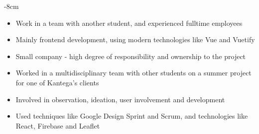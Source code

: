 \documentclass[9pt,a4paper]{altacv}
\begin{document}



\begin{adjustwidth}{}{-8cm}
\makecvheader
\end{adjustwidth}


\begin{itemize}
\item Work in a team with another student, and experienced fulltime employees
\item Mainly frontend development, using modern technologies like Vue and Vuetify
\item Small company - high degree of responsibility and ownership to the project
\end{itemize}

\divider

\begin{itemize}
\item Worked in a multidisciplinary team with other students on a summer project for one of Kantega's clients
\item Involved in observation, ideation, user involvement and development
\item Used techniques like Google Design Sprint and Scrum, and technologies like React, Firebase and Leaflet



\end{itemize}
\end{document}
